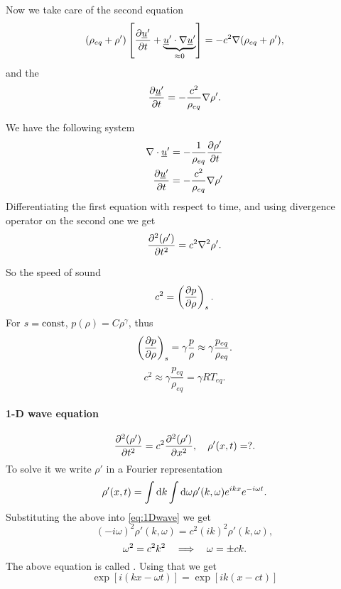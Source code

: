\documentclass[11pt,oneside]{book}
\renewcommand{\vec}[1]{\underline{#1}}
\theoremstyle{definition} %
\theoremstyle{plain} %
\theoremstyle{remark} %
\theoremstyle{underline}
\begin{document}
  Now we take care of the second equation
  \begin{displaymath}
    (\rho_{eq} + \rho') \left[ \ptf{\vec u'}{t} + \underbrace{\vec u' \cdot \nabla \vec u'}_{\approx 0} \right] = - c^2 \nabla (\rho_{eq} + \rho'),
  \end{displaymath}
  and the 
  \begin{displaymath}
    \ptf{\vec u'}{t} = - \frac{c^2}{\rho_{eq}} \nabla \rho'.
  \end{displaymath}

  We have the following system
  \begin{align*}
    \nabla \cdot \vec u' = - \frac{1}{\rho_{eq}} \ptf{\rho'}{t} \\
    \ptf{\vec u'}{t} = - \frac{c^2}{\rho_{eq}} \nabla \rho'
  \end{align*}
  Differentiating the first equation with respect to time, and using divergence operator on the second one we get
  \begin{displaymath}
    \frac{\partial^2 (\rho')}{\partial t ^ 2} = c^2 \nabla^2 \rho'.
  \end{displaymath}

  So the speed of sound
  \begin{displaymath}
    c^2 = \left( \frac{\partial p}{\partial \rho} \right)_s.
  \end{displaymath}
  For $s = \textrm{const}$, $p(\rho) = C \rho^\gamma$, thus
  \begin{displaymath}
    \left( \frac{\partial p}{\partial \rho} \right)_s = \gamma \frac{p}{\rho} \approx \gamma\frac{p_{eq}}{\rho_{eq}}.
  \end{displaymath}
  \begin{displaymath}
    c^2 \approx \gamma \frac{p_{eq}}{\rho_{eq}} = \gamma R T_{eq}.
  \end{displaymath}
  

  \paragraph{1-D wave equation}
  \begin{equation}
    \frac{\partial^2 (\rho')}{\partial t ^ 2} = c^2 \frac{\partial^2 (\rho')}{\partial x ^ 2}, \quad \rho'(x, t) = ?.
    \label{eq:1Dwave}
  \end{equation}
  To solve it we write $\rho'$ in a Fourier representation
  \begin{displaymath}
    \rho'(x,t) = \int\mathrm{d} k \int \mathrm{d} \omega \rho'(k, \omega) e^{ik x} e^{-i\omega t}.
  \end{displaymath}
  Substituting the above into \ref{eq:1Dwave} we get
  \begin{displaymath}
    (- i \omega) ^2 \rho'(k, \omega) = c^2 (i k)^2 \rho'(k,\omega),
  \end{displaymath}
  \begin{displaymath}
    \omega^2 = c^2 k^2 \quad \Longrightarrow \quad \omega = \pm c k.
  \end{displaymath}
  The above equation is called .
  Using that we get
  \begin{displaymath}
    \exp\left[ i (k x - \omega t) \right] = \exp\left[ i k (x - c t)\right]
  \end{displaymath}
\end{document}
